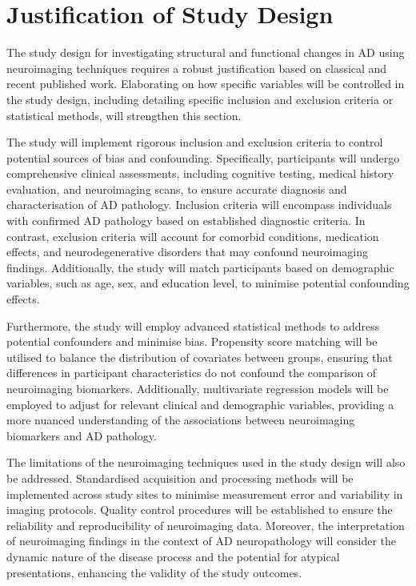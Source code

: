 \documentclass[10pt]{article}
\begin{document}
\begin{sloppypar}
  \section{Justification of Study Design}
  \label{sec:justification-of-study-design}

  The study design for investigating structural and functional changes in AD using neuroimaging techniques requires a robust justification based on classical and recent published work. Elaborating on how specific variables will be controlled in the study design, including detailing specific inclusion and exclusion criteria or statistical methods, will strengthen this section.

  The study will implement rigorous inclusion and exclusion criteria to control potential sources of bias and confounding. Specifically, participants will undergo comprehensive clinical assessments, including cognitive testing, medical history evaluation, and neuroimaging scans, to ensure accurate diagnosis and characterisation of AD pathology. Inclusion criteria will encompass individuals with confirmed AD pathology based on established diagnostic criteria. In contrast, exclusion criteria will account for comorbid conditions, medication effects, and neurodegenerative disorders that may confound neuroimaging findings. Additionally, the study will match participants based on demographic variables, such as age, sex, and education level, to minimise potential confounding effects.

  Furthermore, the study will employ advanced statistical methods to address potential confounders and minimise bias. Propensity score matching will be utilised to balance the distribution of covariates between groups, ensuring that differences in participant characteristics do not confound the comparison of neuroimaging biomarkers. Additionally, multivariate regression models will be employed to adjust for relevant clinical and demographic variables, providing a more nuanced understanding of the associations between neuroimaging biomarkers and AD pathology.

  The limitations of the neuroimaging techniques used in the study design will also be addressed. Standardised acquisition and processing methods will be implemented across study sites to minimise measurement error and variability in imaging protocols. Quality control procedures will be established to ensure the reliability and reproducibility of neuroimaging data. Moreover, the interpretation of neuroimaging findings in the context of AD neuropathology will consider the dynamic nature of the disease process and the potential for atypical presentations, enhancing the validity of the study outcomes.


\end{sloppypar}
\end{document}
